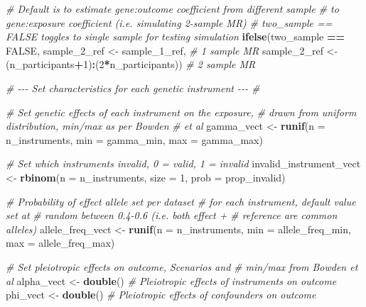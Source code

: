 \documentclass[
]{article}
\newenvironment{Shaded}{\begin{snugshade}}{\end{snugshade}}
\newcommand{\AttributeTok}[1]{\textcolor[rgb]{0.13,0.29,0.53}{#1}}
\newcommand{\CommentTok}[1]{\textcolor[rgb]{0.56,0.35,0.01}{\textit{#1}}}
\newcommand{\ConstantTok}[1]{\textcolor[rgb]{0.56,0.35,0.01}{#1}}
\newcommand{\DecValTok}[1]{\textcolor[rgb]{0.00,0.00,0.81}{#1}}
\newcommand{\FunctionTok}[1]{\textcolor[rgb]{0.13,0.29,0.53}{\textbf{#1}}}
\newcommand{\NormalTok}[1]{#1}
\newcommand{\OtherTok}[1]{\textcolor[rgb]{0.56,0.35,0.01}{#1}}
\newcommand{\SpecialCharTok}[1]{\textcolor[rgb]{0.81,0.36,0.00}{\textbf{#1}}}
\begin{document}
\begin{Shaded}
\begin{Highlighting}[]
  
  \CommentTok{\# Default is to estimate gene:outcome coefficient from different sample}
  \CommentTok{\# to gene:exposure coefficient (i.e. simulating 2{-}sample MR)}
  \CommentTok{\# two\_sample == FALSE toggles to single sample for testing simulation}
  \FunctionTok{ifelse}\NormalTok{(two\_sample }\SpecialCharTok{==} \ConstantTok{FALSE}\NormalTok{,}
\NormalTok{         sample\_2\_ref }\OtherTok{\textless{}{-}}\NormalTok{ sample\_1\_ref, }\CommentTok{\# 1 sample MR}
\NormalTok{         sample\_2\_ref }\OtherTok{\textless{}{-}}\NormalTok{ (n\_participants}\SpecialCharTok{+}\DecValTok{1}\NormalTok{)}\SpecialCharTok{:}\NormalTok{(}\DecValTok{2}\SpecialCharTok{*}\NormalTok{n\_participants)) }\CommentTok{\# 2 sample MR}
  
  \CommentTok{\# {-}{-}{-} Set characteristics for each genetic instrument {-}{-}{-} \# }
  
  \CommentTok{\# Set genetic effects of each instrument on the exposure,}
  \CommentTok{\# drawn from uniform distribution, min/max as per Bowden }
  \CommentTok{\# et al}
\NormalTok{  gamma\_vect }\OtherTok{\textless{}{-}} \FunctionTok{runif}\NormalTok{(}\AttributeTok{n =}\NormalTok{ n\_instruments,}
                      \AttributeTok{min =}\NormalTok{ gamma\_min,}
                      \AttributeTok{max =}\NormalTok{ gamma\_max)}
  
  
  
  \CommentTok{\# Set which instruments invalid, 0 = valid, 1 = invalid}
\NormalTok{  invalid\_instrument\_vect }\OtherTok{\textless{}{-}} \FunctionTok{rbinom}\NormalTok{(}\AttributeTok{n =}\NormalTok{ n\_instruments,}
                                    \AttributeTok{size =} \DecValTok{1}\NormalTok{, }
                                    \AttributeTok{prob =}\NormalTok{ prop\_invalid)}
  
  
  \CommentTok{\# Probability of effect allele set per dataset  }
  \CommentTok{\# for each instrument, default value set at  }
  \CommentTok{\# random between 0.4{-}0.6 (i.e. both effect +}
  \CommentTok{\# reference are common alleles)}
\NormalTok{  allele\_freq\_vect }\OtherTok{\textless{}{-}} \FunctionTok{runif}\NormalTok{(}\AttributeTok{n =}\NormalTok{ n\_instruments,}
                            \AttributeTok{min =}\NormalTok{ allele\_freq\_min,}
                            \AttributeTok{max =}\NormalTok{ allele\_freq\_max)}
  
  \CommentTok{\# Set pleiotropic effects on outcome, Scenarios and }
  \CommentTok{\# min/max from Bowden et al}
\NormalTok{  alpha\_vect }\OtherTok{\textless{}{-}} \FunctionTok{double}\NormalTok{() }\CommentTok{\# Pleiotropic effects of instruments on outcome}
\NormalTok{  phi\_vect }\OtherTok{\textless{}{-}} \FunctionTok{double}\NormalTok{() }\CommentTok{\# Pleiotropic effects of confounders on outcome}
  

\end{Highlighting}
\end{Shaded}
\end{document}
